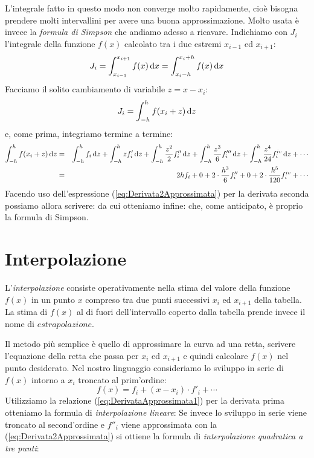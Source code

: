 L'integrale fatto in questo modo non converge molto rapidamente, cio\`e
bisogna prendere molti intervallini per avere una buona approssimazione. Molto
usata \`e invece la {\itshape formula di Simpson} che andiamo adesso a
ricavare.
Indichiamo con $J_i$ l'integrale della funzione $f(x)$ calcolato tra i due
estremi $x_{i-1}$ ed $x_{i+1}$:
$$
J_i = \dintegral{f(x)}{x}{x_{i-1}}{x_{i+1}} =
\dintegral{f(x)}{x}{x_i - h}{x_i + h}
$$
Facciamo il solito cambiamento di variabile $z = x - x_i$:
$$
J_i = \dintegral{f(x_i+z)}{z}{-h}{h}
$$
e, come prima, integriamo termine a termine:
\begin{eqnarray*}
\dintegral{f(x_i+z)}{z}{-h}{h} & = &
\dintegral{f_i}{z}{-h}{h} + 
\dintegral{z f'_i}{z}{-h}{h} +
\dintegral{\frac{z^2}{2}f''_i}{z}{-h}{h} +
\dintegral{\frac{z^3}{6}f'''_i}{z}{-h}{h} +
\dintegral{\frac{z^4}{24}f^{iv}_i}{z}{-h}{h} + \cdots\\
&=& 2hf_i + 0 + 2\cdot \frac{h^3}{6}f''_i + 0 +
2 \cdot \frac{h^5}{120}f^{iv}_i+\cdots
\end{eqnarray*}
Facendo uso dell'espressione (\ref{eq:Derivata2Approssimata}) per la derivata
seconda possiamo allora scrivere:
da cui otteniamo infine:
che, come anticipato, \`e proprio la formula di Simpson.


\section{Interpolazione}

L'\emph{interpolazione} consiste operativamente nella stima del valore
della funzione $f(x)$ in un punto $x$ compreso tra due punti successivi
$x_i$ ed $x_{i+1}$ della tabella.
La stima di $f(x)$ al di fuori dell'intervallo coperto dalla tabella
prende invece il nome di $estrapolazione$.

Il metodo pi\`u semplice \`e quello di approssimare la curva ad una retta,
scrivere l'equazione della retta che passa per $x_i$ ed $x_{i+1}$ e quindi
calcolare $f(x)$ nel punto desiderato. 
Nel nostro linguaggio consideriamo lo sviluppo in serie di $f(x)$ intorno a
$x_i$ troncato al prim'ordine:
$$
f(x) = f_i + (x - x_i) \cdot f'_i + \cdots
$$
Utilizziamo la relazione (\ref{eq:DerivataApprossimata1}) per la derivata
prima otteniamo la formula di \emph{interpolazione lineare}:
Se invece lo sviluppo in serie viene troncato al second'ordine e $f''_i$ viene
approssimata con la (\ref{eq:Derivata2Approssimata}) si ottiene la formula di
\emph{interpolazione quadratica a tre punti}:
